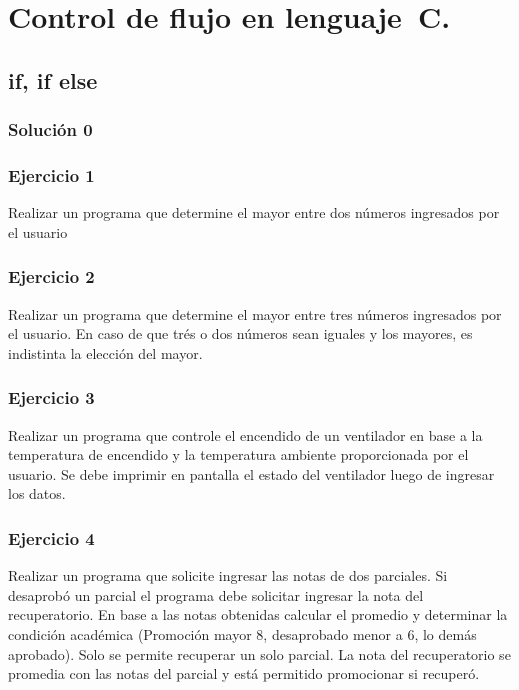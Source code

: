 \section{Control de flujo en lenguaje~C.}
\setcounter{subsection}{4}

\subsection{if, if else}

\subsubsection{Solución 0} 

\lstset{inputencoding=utf8/latin1}

{\small
  \lstset{inputencoding=utf8/latin1}
  
}

\subsubsection{Ejercicio 1} 
Realizar un programa que determine el mayor entre dos números ingresados por el usuario
{\small
  \lstset{inputencoding=utf8/latin1}
  
}

\subsubsection{Ejercicio 2} 
Realizar un programa que determine el mayor entre tres números ingresados por el usuario. En caso de que trés o dos números sean iguales y los mayores, es indistinta la elección del mayor.
{\small
  \lstset{inputencoding=utf8/latin1}
  
}

\subsubsection{Ejercicio 3} 
Realizar un programa que controle el encendido de un ventilador en base a la temperatura de encendido y la temperatura ambiente proporcionada por el usuario. Se debe imprimir en pantalla el estado del ventilador luego de ingresar los datos.
{\small
  \lstset{inputencoding=utf8/latin1}
  
}

\subsubsection{Ejercicio 4} 
Realizar un programa que solicite ingresar las notas de dos parciales. Si desaprobó un parcial el programa debe solicitar ingresar la nota del recuperatorio. En base a las notas obtenidas calcular el promedio y determinar la condición académica (Promoción mayor 8, desaprobado menor a 6, lo demás aprobado). Solo se permite recuperar un solo parcial. La nota del recuperatorio se promedia con las notas del parcial y está permitido promocionar si recuperó.
{\small
  \lstset{inputencoding=utf8/latin1}
  
}

